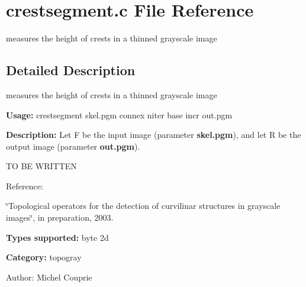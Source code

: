 \section{crestsegment.c File Reference}
\label{crestsegment_8c}
measures the height of crests in a thinned grayscale image  




\label{_details}
\subsection{Detailed Description}
measures the height of crests in a thinned grayscale image 

{\bf Usage:} crestsegment skel.pgm connex niter base incr out.pgm

{\bf Description:} Let F be the input image (parameter {\bf skel.pgm}), and let R be the output image (parameter {\bf out.pgm}).

TO BE WRITTEN

Reference:\par
 \char`\"{}Topological operators for the detection of curvilinar structures in grayscale images\char`\"{}, in preparation, 2003.

{\bf Types supported:} byte 2d

{\bf Category:} topogray

\begin{Desc}
\item[Author:]Michel Couprie \end{Desc}
